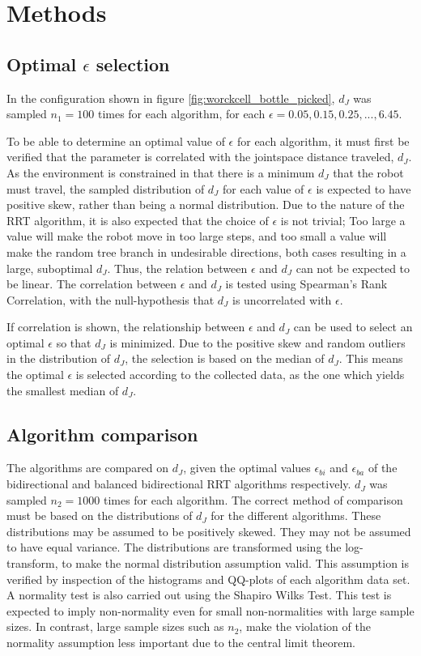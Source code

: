 \section{Methods}
\subsection{Optimal \(\epsilon\) selection}
In the configuration shown in figure \ref{fig:worckcell_bottle_picked},
\(d_J\) was sampled \(n_1=100\) times for each algorithm,
for each \(\epsilon = 0.05, 0.15, 0.25, ..., 6.45\).

To be able to determine an optimal value of \(\epsilon\) for each algorithm,
it must first be verified that the parameter is correlated
with the jointspace distance traveled, \(d_J\).
As the environment is constrained in that there is a minimum \(d_J\)
that the robot must travel, the sampled distribution of \(d_J\) for each
value of \(\epsilon\) is expected to have positive skew,
rather than being a normal distribution.
Due to the nature of the RRT algorithm, it is also expected that
the choice of \(\epsilon\) is not trivial;
Too large a value will make the robot move in too large steps,
and too small a value will make the random tree branch in
undesirable directions, both cases resulting in a large, suboptimal \(d_J\).
Thus, the relation between \(\epsilon\) and \(d_J\) can not be expected to be linear.
The correlation between \(\epsilon\) and \(d_J\) is tested using
Spearman's Rank Correlation, with the null-hypothesis that \(d_J\)
is uncorrelated with \(\epsilon\).

If correlation is shown, the relationship
between \(\epsilon\) and \(d_J\) can be used
to select an optimal \(\epsilon\) so that
\(d_J\) is minimized.
Due to the positive skew and random outliers in the distribution
of \(d_J\), the selection is based on the median
of \(d_J\).
This means the optimal \(\epsilon\) is selected
according to the collected data,
as the one which yields the smallest median of \(d_J\).

\subsection{Algorithm comparison}
The algorithms are compared on \(d_J\),
given the optimal values \(\epsilon_{bi}\) and \(\epsilon_{ba}\)
of the bidirectional and balanced bidirectional RRT algorithms respectively.
\(d_J\) was sampled \(n_2=1000\) times for each algorithm.
The correct method of comparison must be based
on the distributions of \(d_J\) for the different algorithms.
These distributions may be assumed to be positively skewed.
They may not be assumed to have equal variance.
The distributions are transformed using the log-transform,
to make the normal distribution assumption valid.
This assumption is verified by inspection of the histograms
and QQ-plots of each algorithm data set.
A normality test is also carried out using the Shapiro Wilks Test.
This test is expected to imply non-normality even for small
non-normalities with large sample sizes. In contrast,
large sample sizes such as \(n_2\), make the violation of the normality assumption
less important due to the central limit theorem.

